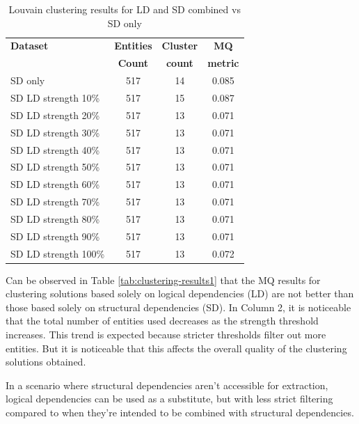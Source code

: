 \documentclass[conference]{IEEEtran}
\begin{document}
\begin{table}[htbp]
  \centering
  \caption{Louvain clustering results for LD and SD combined vs SD only}
  \label{tab:clustering-results2}
  \begin{tabular}{lc|c|c}
    \toprule
    \textbf{Dataset} & \textbf{Entities} & \textbf{Cluster} & \textbf{MQ } \\
    & \textbf{Count} & \textbf{count} &  \textbf{metric} \\
    \midrule
    SD only & 517 & 14 &  0.085  \\
    \midrule
SD  LD  strength    10\%    &   517 &   15  &   0.087   \\
SD  LD  strength    20\%    &   517 &   13  &   0.071   \\
SD  LD  strength    30\%    &   517 &   13  &   0.071   \\
SD  LD  strength    40\%    &   517 &   13  &   0.071   \\
SD  LD  strength    50\%    &   517 &   13  &   0.071   \\
SD  LD  strength    60\%    &   517 &   13  &   0.071   \\
SD  LD  strength    70\%    &   517 &   13  &   0.071   \\
SD  LD  strength    80\%    &   517 &   13  &   0.071   \\
SD  LD  strength    90\%    &   517 &   13  &   0.071   \\
SD  LD  strength    100\%   &   517 &   13  &   0.072   \\

    \bottomrule
  \end{tabular}
\end{table}

Can be observed in Table \ref{tab:clustering-results1} that the MQ results for clustering solutions based solely on logical dependencies (LD) are not better than those based solely on structural dependencies (SD). In Column 2, it is noticeable that the total number of entities used decreases as the strength threshold increases. This trend is expected because stricter thresholds filter out more entities. But it is noticeable that this affects the overall quality of the clustering solutions obtained.

In a scenario where structural dependencies aren't accessible for extraction, logical dependencies can be used as a substitute, but with less strict filtering compared to when they're intended to be combined with structural dependencies.
\end{document}
